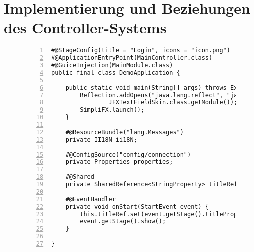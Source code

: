 \chapter{Implementierung und Beziehungen des Controller-Systems}
\label{appendix:demo_application}
\begin{figure}[H]
	\begin{lstlisting}[caption=Demo -- Minimaler Einstiegspunkt., captionpos=b, label=lst:entry_point_demo_full, numbers=left, xleftmargin=1.7em, framexleftmargin=1.7em, nolol]
#@StageConfig(title = "Login", icons = "icon.png")
#@ApplicationEntryPoint(MainController.class)
#@GuiceInjection(MainModule.class)
public final class DemoApplication {

    public static void main(String[] args) throws Exception {
        Reflection.addOpens("java.lang.reflect", "java.base",
				JFXTextFieldSkin.class.getModule());
        SimpliFX.launch();
    }

    #@ResourceBundle("lang.Messages")
    private II18N ii18N;

    #@ConfigSource("config/connection")
    private Properties properties;

    #@Shared
    private SharedReference<StringProperty> titleRef;

    #@EventHandler
    private void onStart(StartEvent event) {
        this.titleRef.set(event.getStage().titleProperty());
        event.getStage().show();
    }

}
	\end{lstlisting}
\end{figure}